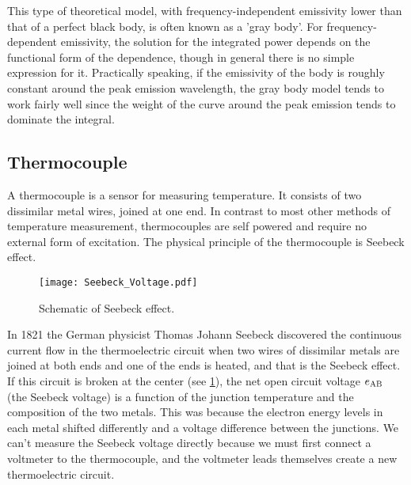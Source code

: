 This type of theoretical model, with frequency-independent emissivity lower than that of a perfect black body, is often known as a 'gray body'. For frequency-dependent emissivity, the solution for the integrated power depends on the functional form of the dependence, though in general there is no simple expression for it. Practically speaking, if the emissivity of the body is roughly constant around the peak emission wavelength, the gray body model tends to work fairly well since the weight of the curve around the peak emission tends to dominate the integral.

\subsection{Thermocouple}
\noindent
A thermocouple is a sensor for measuring temperature.
It consists of two dissimilar metal wires, joined at one end.
In contrast to most other methods of temperature measurement, thermocouples are self powered and require no external form of excitation.
The physical principle of the thermocouple is Seebeck effect.

\begin{figure}[!htp]
	\centering
	\texttt{[image: Seebeck\_Voltage.pdf]}
	\caption{Schematic of Seebeck effect.}
	\label{Fig:Seebeck_Voltage}
\end{figure}
In 1821 the German physicist Thomas Johann Seebeck discovered the continuous current flow in the thermoelectric circuit when two wires of dissimilar metals are joined at both ends and one of the ends is heated, and that is the Seebeck effect.
If this circuit is broken at the center (see \ref{Fig:Seebeck_Voltage}), the net open circuit voltage $e_{\rm AB}$ (the Seebeck voltage) is a function of the junction temperature and the composition of the two metals.
This was because the electron energy levels in each metal shifted differently and a voltage difference between the junctions.
We can't measure the Seebeck voltage directly because we must first connect a voltmeter to the thermocouple, and the voltmeter leads themselves create a new thermoelectric circuit.


